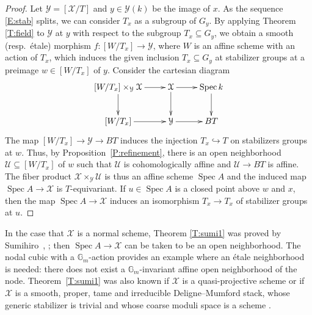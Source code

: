 \documentclass[a4paper]{amsart}
\theoremstyle{plain}
\theoremstyle{definition}
\theoremstyle{remark}
\numberwithin{equation}{section}
\newcommand{\inj}{\hookrightarrow} %
\newcommand{\GG}{\mathbb{G}}
\newcommand\cU{\mathcal{U}}
\newcommand\cX{\mathcal{X}}
\newcommand\cY{\mathcal{Y}}
\newcommand\co{\colon}
\DeclareMathOperator{\Spec}{Spec}
\begin{document}
\begin{proof}%
Let $\cY = [\cX/T]$ and $y \in \cY(k)$ be the image of $x$.  
As the sequence \eqref{E:stab} splits, we can consider $T_x$ as a subgroup of $G_y$.  
By applying Theorem \ref{T:field} to $\cY$ at $y$ with respect to the subgroup $T_x \subseteq G_y$, we obtain a smooth (resp.\ \'etale) morphism $f \co [W/T_x] \to \cY$,
where $W$ is an affine scheme with an action of $T_x$, which induces the given inclusion $T_x \subseteq G_y$ at stabilizer groups at a preimage $w \in [W/T_x]$ of $y$. Consider the cartesian diagram
$$\xymatrix{
[W/T_x] \times_{\cY} \cX \ar[r] \ar[d]		& \cX \ar[d]\ar[r] & \Spec k\ar[d] \\
[W/T_x] \ar[r]						& \cY\ar[r] & BT
}$$
The map $[W/T_x]\to \cY\to BT$ induces the injection $T_x\inj T$ on stabilizers
groups at $w$. Thus, by
Proposition~\ref{P:refinement},
there is an
open neighborhood $\cU\subseteq [W/T_x]$ of $w$ such that $\cU$ is
cohomologically affine and $\cU\to BT$ is affine. The fiber product
$\cX\times_\cY \cU$ is thus an affine scheme $\Spec A$ and the induced map
$\Spec A\to \cX$ is $T$-equivariant. If $u\in \Spec A$ is a closed point above
$w$ and $x$, then the map $\Spec A\to \cX$ induces an isomorphism $T_x\to T_x$
of stabilizer groups at $u$.
\end{proof}

In the case that $\cX$ is a normal scheme, Theorem \ref{T:sumi1} was proved by
Sumihiro~\cite[Cor.~2]{sumihiro}, \cite[Cor.~3.11]{sumihiro2}; then $\Spec A
\to \cX$ can be taken to be an open neighborhood.  The nodal cubic with a
$\GG_m$-action provides an example where an \'etale neighborhood is needed:
there does not exist a
$\GG_m$-invariant affine open neighborhood of the node. Theorem~\ref{T:sumi1} was also known if
$\cX$ is a quasi-projective scheme \cite[Thm.~1.1(iii)]{brion-linearization} or
if $\cX$ is a smooth, proper, tame and irreducible Deligne--Mumford stack,
whose generic stabilizer is trivial and whose coarse moduli space is a scheme
\cite[Prop.~3.2]{skowera}.
\end{document}
